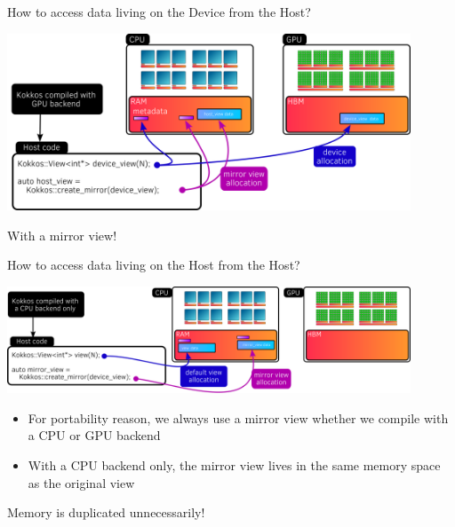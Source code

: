 \documentclass[aspectratio=169]{beamer}
\begin{document}

\begin{frame}{How to access data living on the Device from the Host?}
    \begin{center}
        \includegraphics[width=0.9\textwidth]{device_mirror_view.png}
    \end{center}

     With a mirror view!
\end{frame}


\begin{frame}{How to access data living on the Host from the Host?}
    \begin{center}
        \includegraphics[width=0.9\textwidth]{host_mirror_view.png}
    \end{center}
    \begin{itemize}
        \item For portability reason, we always use a mirror view whether we compile with a CPU or GPU backend
        \item With a CPU backend only, the mirror view lives in the same memory space as the original view
    \end{itemize}

     Memory is duplicated unnecessarily!
\end{frame}

\end{document}

